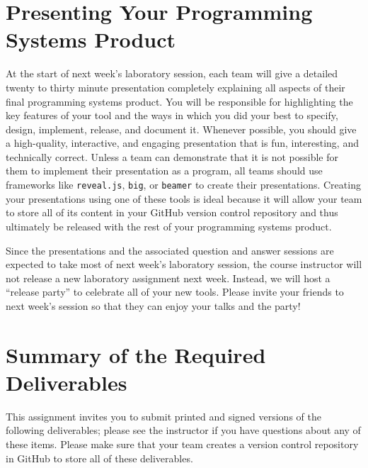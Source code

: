 \section*{Presenting Your Programming Systems Product}

At the start of next week's laboratory session, each team will give a detailed twenty to thirty minute presentation
completely explaining all aspects of their final programming systems product. You will be responsible for highlighting
the key features of your tool and the ways in which you did your best to specify, design, implement, release, and
document it.  Whenever possible, you should give a high-quality, interactive, and engaging presentation that is fun,
interesting, and technically correct. Unless a team can demonstrate that it is not possible for them to implement their
presentation as a program, all teams should use frameworks like {\tt reveal.js}, {\tt big}, or {\tt beamer} to create
their presentations. Creating your presentations using one of these tools is ideal because it will allow your team to
store all of its content in your GitHub version control repository and thus ultimately be released with the rest of your
programming systems product.

Since the presentations and the associated question and answer sessions are expected to take most of next week's
laboratory session, the course instructor will not release a new laboratory assignment next week. Instead, we will host
a ``release party'' to celebrate all of your new tools. Please invite your friends to next week's session so that they
can enjoy your talks and the party!

\section*{Summary of the Required Deliverables}

This assignment invites you to submit printed and signed versions of the following deliverables; please see the
instructor if you have questions about any of these items. Please make sure that your team creates a version control
repository in GitHub to store all of these deliverables.

